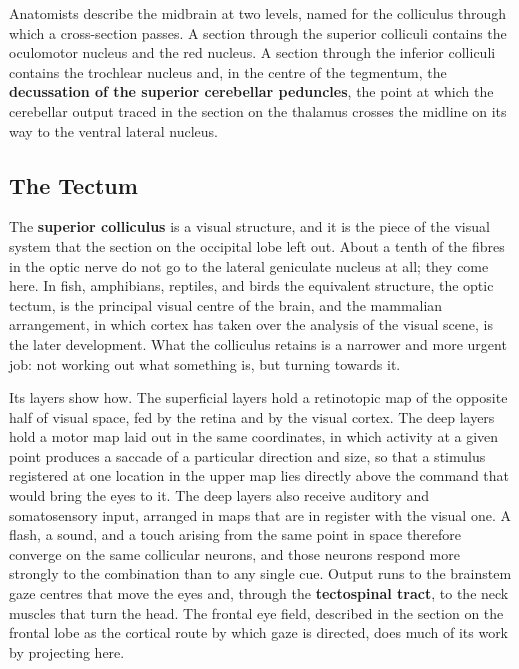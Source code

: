 \documentclass[11pt]{article}
\begin{document}
Anatomists describe the midbrain at two levels, named for the colliculus through which a cross-section passes. A section through the superior colliculi contains the oculomotor nucleus and the red nucleus. A section through the inferior colliculi contains the trochlear nucleus and, in the centre of the tegmentum, the \textbf{decussation of the superior cerebellar peduncles}, the point at which the cerebellar output traced in the section on the thalamus crosses the midline on its way to the ventral lateral nucleus.

\subsection{The Tectum}

The \textbf{superior colliculus} is a visual structure, and it is the piece of the visual system that the section on the occipital lobe left out. About a tenth of the fibres in the optic nerve do not go to the lateral geniculate nucleus at all; they come here. In fish, amphibians, reptiles, and birds the equivalent structure, the optic tectum, is the principal visual centre of the brain, and the mammalian arrangement, in which cortex has taken over the analysis of the visual scene, is the later development. What the colliculus retains is a narrower and more urgent job: not working out what something is, but turning towards it.

Its layers show how. The superficial layers hold a retinotopic map of the opposite half of visual space, fed by the retina and by the visual cortex. The deep layers hold a motor map laid out in the same coordinates, in which activity at a given point produces a saccade of a particular direction and size, so that a stimulus registered at one location in the upper map lies directly above the command that would bring the eyes to it. The deep layers also receive auditory and somatosensory input, arranged in maps that are in register with the visual one. A flash, a sound, and a touch arising from the same point in space therefore converge on the same collicular neurons, and those neurons respond more strongly to the combination than to any single cue. Output runs to the brainstem gaze centres that move the eyes and, through the \textbf{tectospinal tract}, to the neck muscles that turn the head. The frontal eye field, described in the section on the frontal lobe as the cortical route by which gaze is directed, does much of its work by projecting here.
\end{document}
